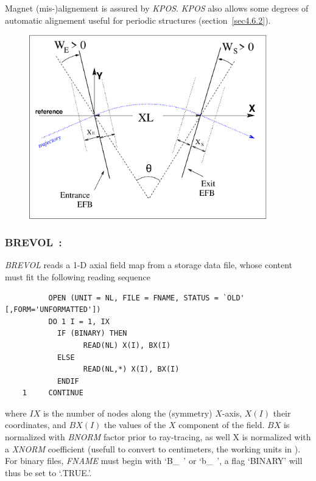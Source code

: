 \bigskip

\noindent Magnet (mis-)alignement is assured by \textsl{KPOS}. 
\textsl{KPOS} also  allows some degrees of automatic alignement useful for periodic structures (section~\ref{sec4.6.2}).

\vfill
\begin{figure}[H]
  \centerline{\includegraphics[height=8cm]{Fig14.eps}}
  {\setlength{\captionwidth}{12cm}
	\hangcaption[Fig14]{\label{fig14}
               \CapBEND
    } }
\end{figure}

\vfill
\newpage


\subsubsection*{BREVOL~: \BREVOLTitl} \label{BREVOL}
\medskip

\textsl{BREVOL}  reads a 1-D axial field map from a storage data file,
whose content must fit the following \FORTRAN reading sequence   
\bigskip


{\footnotesize
\begin{verbatim}
	      OPEN (UNIT = NL, FILE = FNAME, STATUS = `OLD' [,FORM='UNFORMATTED'])
	      DO 1 I = 1, IX
	        IF (BINARY) THEN 
	              READ(NL) X(I), BX(I)
	        ELSE
	              READ(NL,*) X(I), BX(I)
	        ENDIF
	1     CONTINUE
\end{verbatim}}
\medskip

\noindent where $IX$ is the number of nodes along the (symmetry) $X$-axis, $X(I)$
their coordinates, and $BX(I)$ the values of the $X$ component of the field. $BX$ is 
normalized with \textsl{BNORM} factor prior to ray-tracing, as well  X is normalized with 
a  \textsl{XNORM} coefficient (usefull to convert to centimeters, the working units in  \zgoubi). 
For binary files, \textsl{FNAME} must begin with \mbox{`B\_ '} or  \mbox{`b\_ '}, 
a flag `BINARY' will thus be set to `.TRUE.'. 

